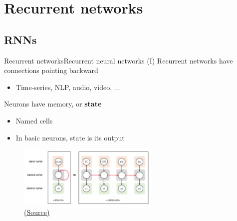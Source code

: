 \documentclass[10pt,compress]{beamer} %
\begin{document}
\section{Recurrent networks}
\subsection{RNNs}
\begin{frame}{Recurrent networks}{Recurrent neural networks (I)}
	Recurrent networks have connections pointing backward
    \begin{itemize}
        \item Time-series, NLP, audio, video, ...
    \end{itemize}
    Neurons have memory, or \textbf{state}
    \begin{itemize}
        \item Named \alert{cells}
        \item In basic neurons, state is its output
    \end{itemize}

	\begin{figure}
        \includegraphics[width=0.6\textwidth]{figs/recurrent.png}\\
	    \scriptsize\href{https://www.bouvet.no/bouvet-deler/explaining-recurrent-neural-networks}{(Source)}
	\end{figure}
\end{frame}
\end{document}
